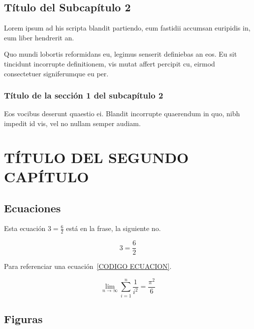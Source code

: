 \documentclass[thesis]{udpbook}
\begin{document}
\section{Título del Subcapítulo 2} \label{chsub:Título del Subcapítulo 2}

\parindent=0pt Lorem ipsum ad his scripta blandit partiendo, eum fastidii accumsan euripidis in, eum liber hendrerit an. 

\vspace{0.5cm}
\parindent=30pt Quo mundi lobortis reformidans eu, legimus senserit definiebas an eos. Eu sit tincidunt incorrupte definitionem, vis mutat affert percipit cu, eirmod consectetuer signiferumque eu per.

\subsection{Título de la sección 1 del subcapítulo 2}\label{chsub:Título de la sección 1 del subcapítulo 2}

\parindent=0pt Eos vocibus deserunt quaestio ei. Blandit incorrupte quaerendum in quo, nibh impedit id vis, vel no nullam semper audiam. 


\chapter[TÍTULO DEL SEGUNDO CAPÍTULO ]{TÍTULO DEL SEGUNDO CAPÍTULO }\label{ch:capitulo2}
 


\section{Ecuaciones} \label{chsub:ecuaciones}


Esta ecuación $3=\frac{6}{2}$ está en la frase, la siguiente no.


  \[3=\frac{6}{2}
\]


Para referenciar una ecuación~\ref{CODIGO ECUACION}.

\begin{equation}
\label{CODIGO ECUACION}
\lim_{n\to\infty}
\sum_{i=1}^n\frac{1}{i^2}=
\frac{\pi^2}{6}
\end{equation}


\section{Figuras} \label{chsub:figuras}
\end{document}
